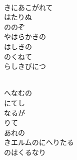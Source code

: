 \documentclass[10pt,b5j]{tarticle} %
\begin{document}
\vspace{1.5em} %
\newcommand{\linespace}{0.5em} %
\newcommand{\blocksize}{0.5\hsize} %
\newcommand{\itemmargin}{3em} %
\begin{enumerate} %
    \setlength{\itemindent}{\itemmargin} %
    \begin{minipage}[c]{\blocksize}
    
        \vspace{\linespace}
        \item~\\
        きにあこがれて\\
        はたりぬ\\
        ののぞ\\
        やはらかきの\\
        はしきの\\
        のくねて\\
        らしきびにつ
        
    \end{minipage}
    \begin{minipage}[c]{\blocksize}
        
        \vspace{\linespace}
        \item~\\
        へなむの\\
        にてし\\
        なるが\\
        りて\\
        あれの\\
        きエルムのにへりたる\\
        のはくるなり
        
    \end{minipage}
    \begin{minipage}[c]{\blocksize}
        

\end{minipage}
\end{enumerate}
\end{document}
